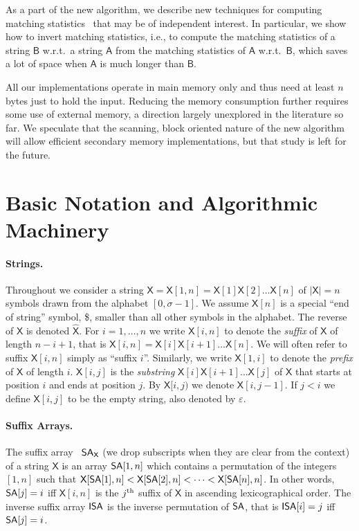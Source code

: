 \documentclass[runningheads]{llncs}
\def\reverse#1{\hat{#1}}
\def\SA{\mbox{\rm {\sf SA}}}
\def\ISA{\mbox{\rm {\sf ISA}}}
\def\X{\textsf{X}}
\def\B{\textsf{B}}
\def\A{\textsf{A}}
\begin{document}
As a part of the new algorithm, we describe new techniques for
computing matching statistics~\cite{cl1994} that may be of independent
interest. In particular, we show how to invert matching statistics,
i.e., to compute the matching statistics of a string $\B$ w.r.t.~a
string $\A$ from the matching statistics of $\A$ w.r.t.~$\B$, which
saves a lot of space when $\A$ is much longer than $\B$.

All our implementations operate in main memory only and thus need at
least $n$ bytes just to hold the input. Reducing the memory
consumption further requires some use of external memory, a direction
largely unexplored in the literature so far.  We speculate
that the scanning, block oriented nature of the new algorithm will allow
efficient secondary memory implementations, but that study is left for
the future.

\section{Basic Notation and Algorithmic Machinery}
\label{sec-preliminaries}

\paragraph{Strings.}
Throughout we consider a string $\X = \X[1,n] = \X[1]\X[2]\ldots
\X[n]$ of $|\X| = n$ symbols drawn from the alphabet $[0,\sigma-1]$.
We assume $\X[n]$ is a special ``end of string'' symbol, \$, smaller than
all other symbols in the alphabet.
The reverse of $\X$ is denoted $\reverse{\X}$.  For $i=1,\ldots,n$ we
write $\X[i,n]$ to denote the {\em suffix} of $\X$ of length $n-i+1$,
that is $\X[i,n] = \X[i]\X[i+1]\ldots \X[n]$.  We will often refer to
suffix $\X[i,n]$ simply as ``suffix $i$''. Similarly, we write
$\X[1,i]$ to denote the {\em prefix} of $\X$ of length $i$.
$\X[i,j]$ is the {\em substring} $\X[i]\X[i+1]\ldots \X[j]$ of $\X$
that starts at position $i$ and ends at position $j$. By $\X[i,j)$ we
denote $\X[i,j-1]$.  If $j < i$ we
define $\X[i,j]$ to be the empty string, also denoted by
$\varepsilon$.

\paragraph{Suffix Arrays.}
The suffix array~\cite{mm1993} $\SA_{\X}$ (we drop subscripts when
they are clear
from the context) of a string $\X$ 
is an array $\SA[1,n]$ which
contains a permutation of the integers $[1,n]$ such that $\X[\SA[1],n]
< \X[\SA[2],n] < \cdots < \X[\SA[n],n]$.  In other words, $\SA[j] =
i$ iff $\X[i,n]$ is the $j^{\mbox{{\scriptsize th}}}$ suffix of $\X$
in ascending lexicographical order. The inverse
suffix array $\ISA$ is the inverse permutation of $\SA$, that is
$\ISA[i] = j$ iff $\SA[j] = i$.
\end{document}
